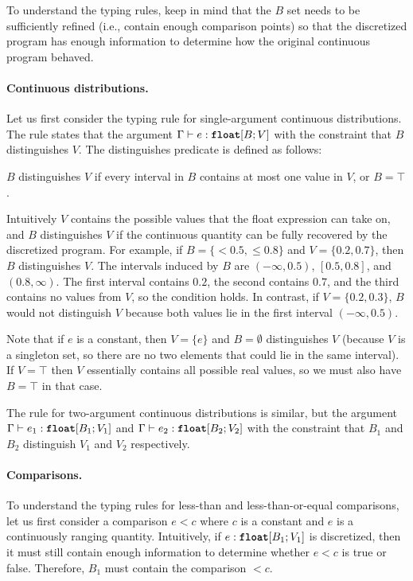 To understand the typing rules, keep in mind that the $B$ set needs to be sufficiently refined (i.e., contain enough comparison points) so that the discretized program has enough information to determine how the original continuous program behaved.



\paragraph{Continuous distributions.} Let us first consider the typing rule for single-argument continuous distributions.
The rule states that the argument $\Gamma \vdash e : \text{\ttfamily\bfseries float}[B; V]$ with the constraint that $B$ distinguishes $V$. The distinguishes predicate is defined as follows:
\begin{definition}
    \label{def:distinguishes}
    $B$ distinguishes $V$ if every interval in $B$ contains at most one value in $V$, or $B = \top$.
\end{definition}
Intuitively $V$ contains the possible values that the float expression can take on, and $B$ distinguishes $V$ if the continuous quantity can be fully recovered by the discretized program.
For example, if $B = \{<\!\!0.5, \leq\!\!0.8\}$ and $V = \{0.2, 0.7\}$, then $B$ distinguishes $V$. The intervals induced by $B$ are $(-\infty, 0.5)$, $[0.5, 0.8]$, and $(0.8, \infty)$. The first interval contains $0.2$, the second contains $0.7$, and the third contains no values from $V$, so the condition holds. In contrast, if $V = \{0.2, 0.3\}$, $B$ would not distinguish $V$ because both values lie in the first interval $(-\infty, 0.5)$.

Note that if $e$ is a constant, then $V = \{e\}$ and $B = \emptyset$ distinguishes $V$ (because $V$ is a singleton set, so there are no two elements that could lie in the same interval).
If $V = \top$ then $V$ essentially contains all possible real values, so we must also have $B = \top$ in that case.

The rule for two-argument continuous distributions is similar, but the argument $\Gamma \vdash e_1 : \text{\ttfamily\bfseries float}[B_1; V_1]$ and $\Gamma \vdash e_2 : \text{\ttfamily\bfseries float}[B_2; V_2]$ with the constraint that $B_1$ and $B_2$ distinguish $V_1$ and $V_2$ respectively.



\paragraph{Comparisons.} 
To understand the typing rules for less-than and less-than-or-equal comparisons, let us first consider a comparison $e < c$ where $c$ is a constant and $e$ is a continuously ranging quantity. Intuitively, if $e : \text{\ttfamily\bfseries float}[B_1; V_1]$ is discretized, then it must still contain enough information to determine whether $e < c$ is true or false. Therefore, $B_1$ must contain the comparison $<\!\!c$.

